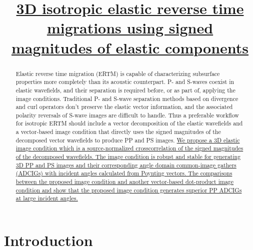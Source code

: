 \documentclass[manuscript,ulem,graphix,revised]{geophysics}
\begin{document}
\title{\uline{3D isotropic elastic reverse time migrations using signed magnitudes of elastic components}}
\marginpar{[3]}

%
%
\author{\vspace{-9ex}}


\renewcommand{\figdir}{Fig} %

\begin{abstract}

Elastic reverse time migration (ERTM) is capable of characterizing subsurface properties more completely than its acoustic counterpart. P- and S-waves coexist in elastic wavefields, and their separation is required before, or as part of, applying the image conditions. Traditional P- and S-wave separation methods based on divergence and curl operators don't preserve the elastic vector information, and the associated polarity reversals of S-wave images are difficult to handle. Thus a preferable workflow for isotropic ERTM should include a vector decomposition of the elastic wavefields and a vector-based image condition that directly uses the signed magnitudes of the decomposed vector wavefields to produce PP and PS images. 
\marginpar{[1,12]}\uline{We propose a 3D elastic image condition which is a source-normalized crosscorrelation of the signed magnitudes of the decomposed wavefields.
The image condition is robust and stable for generating 3D PP and PS images and their corresponding angle domain common-image gathers (ADCIGs) with incident angles calculated from Poynting vectors.
The comparisons between the proposed image condition and another vector-based dot-product image condition and show that the proposed image condition generates superior PP ADCIGs at large incident angles.
}
\end{abstract}

\section{Introduction}
\end{document}
